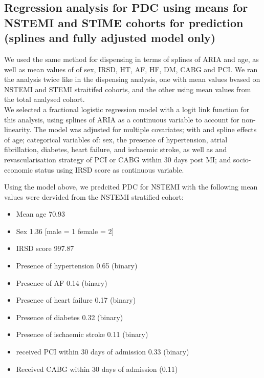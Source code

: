 \documentclass[11pt]{article}
\begin{document}
\subsection{Regression analysis for PDC using means for NSTEMI and STIME cohorts for prediction (splines and fully adjusted model only)}
We used the same method for dispensing in terms of splines of ARIA and age, as well as mean values of of sex, IRSD, HT, AF, HF, DM, CABG and PCI. We ran the analysis twice like in the dispensing analysis, one with mean values bvased on NSTEMI and STEMI straitifed cohorts, and the other using mean values from the total analysed cohort. \\
We selected a fractional logistic regression model with a logit link function for this analysis, using splines of ARIA as a continuous variable to account for non-linearity. The model was adjusted for multiple covariates; with and spline effects of age; categorical variables of: sex, the presence of hypertension, atrial fibrillation, diabetes, heart failure, and ischaemic stroke, as well as and revascularisation strategy of PCI or CABG within 30 days post MI; and socio-economic status using IRSD score as continuous variable. \\
\color{violet}
\begin{stlog}\end{stlog}
\color{black}
Using the model above, we predcited PDC for NSTEMI with the following mean values were dervided from the NSTEMI stratified cohort: \\
\begin{itemize}
\item Mean age 70.93
\item Sex 1.36 [male = 1 female = 2]
\item IRSD score 997.87
\item Presence of hypertension 0.65 (binary)
\item Presence of AF 0.14 (binary)
\item Presence of heart failure 0.17 (binary)
\item Presence of diabetes 0.32 (binary)
\item Presence of ischaemic stroke 0.11 (binary)
\item received PCI within 30 days of admission 0.33 (binary)
\item Received CABG within 30 days of admission (0.11)
\end{itemize}
\end{document}
